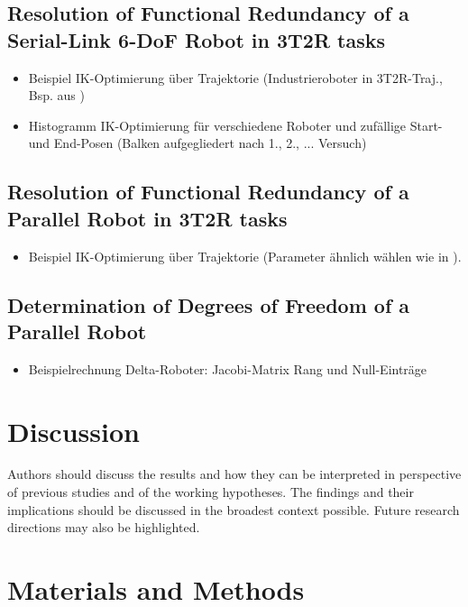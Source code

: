 \documentclass[robotics,article,submit,moreauthors,pdftex]{Definitions/mdpi}
\begin{document}
\subsection{Resolution of Functional Redundancy of a Serial-Link 6-DoF Robot in 3T2R tasks}


\begin{itemize}
    \item Beispiel IK-Optimierung über Trajektorie (Industrieroboter in 3T2R-Traj., Bsp. aus \cite{HuoBar2008,HuoBar2011})
    \item Histogramm IK-Optimierung für verschiedene Roboter und zufällige Start- und End-Posen (Balken aufgegliedert nach 1., 2., ... Versuch)
\end{itemize}

\subsection{Resolution of Functional Redundancy of a Parallel Robot in 3T2R tasks}

\begin{itemize}
    \item Beispiel IK-Optimierung über Trajektorie (Parameter ähnlich wählen wie in \cite{MerletPerDan2000}).
\end{itemize}


\subsection{Determination of Degrees of Freedom of a Parallel Robot}

\begin{itemize}
    \item Beispielrechnung Delta-Roboter: Jacobi-Matrix Rang und Null-Einträge
\end{itemize}
\section{Discussion}

Authors should discuss the results and how they can be interpreted in perspective of previous studies and of the working hypotheses. The findings and their implications should be discussed in the broadest context possible. Future research directions may also be highlighted.

\section{Materials and Methods}
\end{document}
